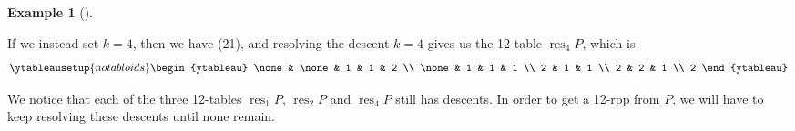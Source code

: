 \documentclass[numbers=enddot,12pt,final,onecolumn,notitlepage]{scrartcl}%
\theoremstyle{definition}
\newtheorem{exmp}[theo]{Example}
\newenvironment{example}[1][]
{\begin{exmp}[#1]\begin{leftbar}}
{\end{leftbar}\end{exmp}}
\begin{document}
\begin{example}
If we instead set $k=4$, then we have (21), and resolving the descent
$k=4$ gives us the 12-table $\operatorname*{res}\nolimits_{4}P$, which is
\[
\ytableausetup{notabloids}
\begin{ytableau}
\none& \none& 1 & 1 & 2 \\
\none& 1 & 1 & 1 \\
2 & 1 & 1 \\
2 & 2 & 1 \\
2
\end{ytableau}%
\]

We notice that each of the three 12-tables $\operatorname*{res}\nolimits_{1}%
P$, $\operatorname*{res}\nolimits_{2}P$ and $\operatorname*{res}%
\nolimits_{4}P$ still has descents. In order to get a 12-rpp from
$P$, we will have to keep resolving these descents until none remain.
\end{example}

\end{document}
